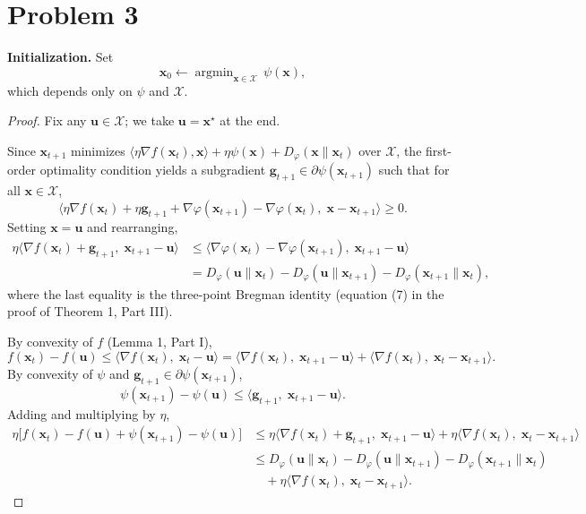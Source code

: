 \documentclass[12pt]{article}
\begin{document}
\section*{Problem 3}

\textbf{Initialization.} Set
\[
\mathbf{x}_0 \leftarrow \operatorname{argmin}_{\mathbf{x} \in \mathcal{X}}\, \psi(\mathbf{x}),
\]
which depends only on $\psi$ and $\mathcal{X}$.

\begin{proof}
Fix any $\mathbf{u} \in \mathcal{X}$; we take $\mathbf{u} = \mathbf{x}^\star$ at the end.

Since $\mathbf{x}_{t+1}$ minimizes $\langle \eta \nabla f(\mathbf{x}_t), \mathbf{x}\rangle + \eta\psi(\mathbf{x}) + D_\varphi(\mathbf{x} \| \mathbf{x}_t)$ over $\mathcal{X}$, the first-order optimality condition yields a subgradient $\mathbf{g}_{t+1} \in \partial\psi(\mathbf{x}_{t+1})$ such that for all $\mathbf{x} \in \mathcal{X}$,
\[
\langle \eta \nabla f(\mathbf{x}_t) + \eta \mathbf{g}_{t+1} + \nabla\varphi(\mathbf{x}_{t+1}) - \nabla\varphi(\mathbf{x}_t),\; \mathbf{x} - \mathbf{x}_{t+1}\rangle \ge 0.
\]
Setting $\mathbf{x} = \mathbf{u}$ and rearranging,
\begin{align*}
\eta\langle \nabla f(\mathbf{x}_t) + \mathbf{g}_{t+1},\; \mathbf{x}_{t+1} - \mathbf{u}\rangle
&\le \langle \nabla\varphi(\mathbf{x}_t) - \nabla\varphi(\mathbf{x}_{t+1}),\; \mathbf{x}_{t+1} - \mathbf{u}\rangle \\
&= D_\varphi(\mathbf{u} \| \mathbf{x}_t) - D_\varphi(\mathbf{u} \| \mathbf{x}_{t+1}) - D_\varphi(\mathbf{x}_{t+1} \| \mathbf{x}_t),
\end{align*}
where the last equality is the three-point Bregman identity (equation (7) in the proof of Theorem 1, Part III).

By convexity of $f$ (Lemma 1, Part I),
\[
f(\mathbf{x}_t) - f(\mathbf{u}) \le \langle \nabla f(\mathbf{x}_t),\; \mathbf{x}_t - \mathbf{u}\rangle = \langle \nabla f(\mathbf{x}_t),\; \mathbf{x}_{t+1} - \mathbf{u}\rangle + \langle \nabla f(\mathbf{x}_t),\; \mathbf{x}_t - \mathbf{x}_{t+1}\rangle.
\]
By convexity of $\psi$ and $\mathbf{g}_{t+1} \in \partial\psi(\mathbf{x}_{t+1})$,
\[
\psi(\mathbf{x}_{t+1}) - \psi(\mathbf{u}) \le \langle \mathbf{g}_{t+1},\; \mathbf{x}_{t+1} - \mathbf{u}\rangle.
\]
Adding and multiplying by $\eta$,
\begin{align*}
\eta\bigl[f(\mathbf{x}_t) - f(\mathbf{u}) + \psi(\mathbf{x}_{t+1}) - \psi(\mathbf{u})\bigr]
&\le \eta\langle \nabla f(\mathbf{x}_t) + \mathbf{g}_{t+1},\; \mathbf{x}_{t+1} - \mathbf{u}\rangle + \eta\langle \nabla f(\mathbf{x}_t),\; \mathbf{x}_t - \mathbf{x}_{t+1}\rangle \\
&\le D_\varphi(\mathbf{u} \| \mathbf{x}_t) - D_\varphi(\mathbf{u} \| \mathbf{x}_{t+1}) - D_\varphi(\mathbf{x}_{t+1} \| \mathbf{x}_t) \\
&\quad + \eta\langle \nabla f(\mathbf{x}_t),\; \mathbf{x}_t - \mathbf{x}_{t+1}\rangle.
\end{align*}


\end{proof}
\end{document}
